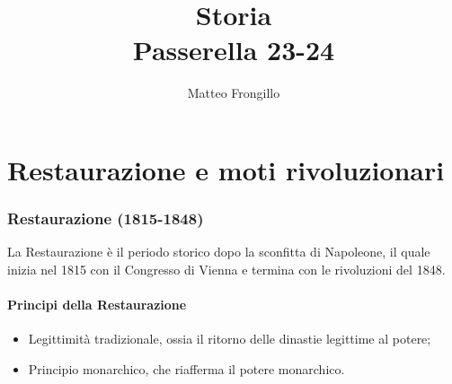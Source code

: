 \documentclass{article}
\title{\textbf{Storia\\Passerella 23-24}}
\author{Matteo Frongillo}
\begin{document}
\maketitle
\tableofcontents

\newpage
\part{Restaurazione e moti rivoluzionari}

\section{Restaurazione (1815-1848)}
La Restaurazione è il periodo storico dopo la sconfitta di Napoleone, il quale inizia nel 1815
con il Congresso di Vienna e termina con le rivoluzioni del 1848.

\subsection{Principi della Restaurazione}
\begin{itemize}
    \item Legittimità tradizionale, ossia il ritorno delle dinastie legittime al potere;
    \item Principio monarchico, che riafferma il potere monarchico.
\end{itemize}
\end{document}
